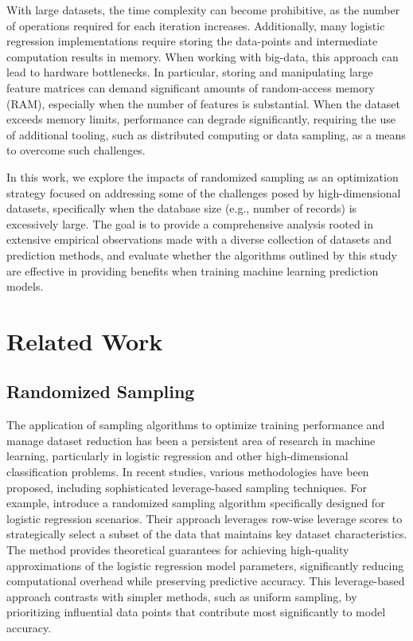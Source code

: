 \documentclass{article}
\theoremstyle{plain}
\theoremstyle{definition}
\theoremstyle{remark}
\begin{document}
With large datasets, the time complexity can become prohibitive, as the number of operations required for each iteration increases. Additionally, many logistic regression implementations require storing the data-points and intermediate computation results in memory. When working with big-data, this approach can lead to hardware bottlenecks. In particular, storing and manipulating large feature matrices can demand significant amounts of random-access memory (RAM), especially when the number of features is substantial. When the dataset exceeds memory limits, performance can degrade significantly, requiring the use of additional tooling, such as distributed computing or data sampling, as a means to overcome such challenges.

In this work, we explore the impacts of randomized sampling as an optimization strategy focused on addressing some of the challenges posed by high-dimensional datasets, specifically when the database size (e.g., number of records) is excessively large. The goal is to provide a comprehensive analysis rooted in extensive empirical observations made with a diverse collection of datasets and prediction methods, and evaluate whether the algorithms outlined by this study are effective in providing benefits when training machine learning prediction models.


\section{Related Work}

\subsection{Randomized Sampling}

The application of sampling algorithms to optimize training performance and manage dataset reduction has been a persistent area of research in machine learning, particularly in logistic regression and other high-dimensional classification problems. In recent studies, various methodologies have been proposed, including sophisticated leverage-based sampling techniques. For example, \citeauthor{chow24} introduce a randomized sampling algorithm specifically designed for logistic regression scenarios. Their approach leverages row-wise leverage scores to strategically select a subset of the data that maintains key dataset characteristics. The method provides theoretical guarantees for achieving high-quality approximations of the logistic regression model parameters, significantly reducing computational overhead while preserving predictive accuracy. This leverage-based approach contrasts with simpler methods, such as uniform sampling, by prioritizing influential data points that contribute most significantly to model accuracy.
\end{document}
